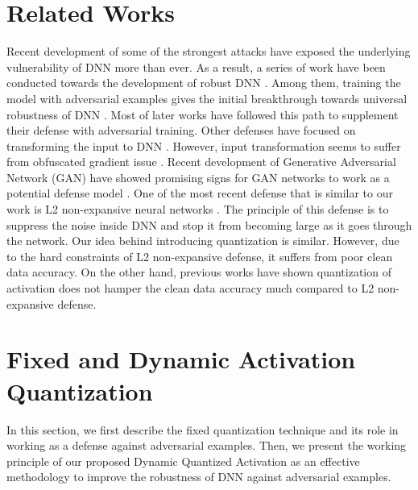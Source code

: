 \documentclass{article}
\begin{document}
\section{Related Works}

Recent development of some of the strongest \cite{madry2017towards,carlini2017towards,athalye2018obfuscated,chen2017zoo} attacks have exposed the underlying vulnerability of DNN more than ever. As a result, a series of work have been conducted towards the development of robust DNN \cite{samangouei2018defense,papernot2016transferability,madry2017towards,qian2018l2,santhanam2018defending,xie2017mitigating,guo2017countering,tramer2017ensemble,raghunathan2018certified,dhillon2018stochastic,prakash2018deflecting}. Among them, training the model with adversarial examples gives the initial breakthrough towards universal robustness of DNN \cite{madry2017towards}. Most of later works have followed this path to supplement their defense with adversarial training. Other defenses have focused on transforming the input to DNN \cite{buckman2018thermometer,guo2017countering}. However, input transformation seems to suffer from obfuscated gradient issue \cite{athalye2018obfuscated}. Recent development of Generative Adversarial Network (GAN) have showed promising signs for GAN networks to work as a potential defense model \cite{santhanam2018defending,samangouei2018defense}. One of the most recent defense that is similar to our work is L2 non-expansive neural networks \cite{qian2018l2}. The principle of this defense is to suppress the noise inside DNN and stop it from becoming large as it goes through the network. Our idea behind introducing quantization is similar. However, due to the hard constraints of L2 non-expansive defense, it suffers from poor clean data accuracy. On the other hand, previous works have shown quantization of activation does not hamper the clean data accuracy much \cite{zhou2016dorefa} compared to L2 non-expansive defense.



\section{Fixed and Dynamic Activation Quantization}

In this section, we first describe the fixed quantization technique and its role in working as a defense against adversarial examples. Then, we present the working principle of our proposed Dynamic Quantized Activation as an effective methodology to improve the robustness of DNN against adversarial examples.  
\end{document}
